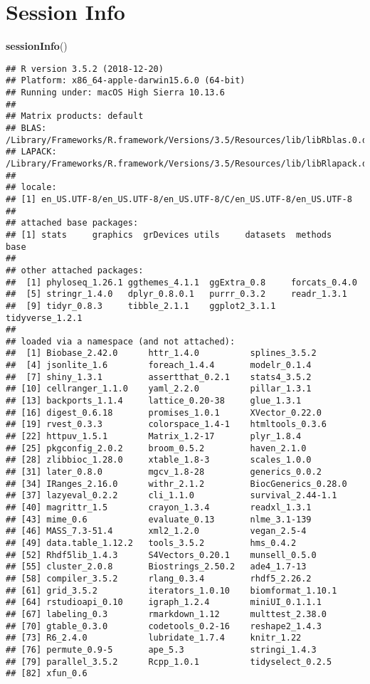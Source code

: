\documentclass[]{article}
\newenvironment{Shaded}{\begin{snugshade}}{\end{snugshade}}
\newcommand{\KeywordTok}[1]{\textcolor[rgb]{0.13,0.29,0.53}{\textbf{{#1}}}}
\newcommand{\NormalTok}[1]{{#1}}
\begin{document}
\section{Session Info}\label{session-info}

\begin{Shaded}
\begin{Highlighting}[]
\KeywordTok{sessionInfo}\NormalTok{()}
\end{Highlighting}
\end{Shaded}

\begin{verbatim}
## R version 3.5.2 (2018-12-20)
## Platform: x86_64-apple-darwin15.6.0 (64-bit)
## Running under: macOS High Sierra 10.13.6
## 
## Matrix products: default
## BLAS: /Library/Frameworks/R.framework/Versions/3.5/Resources/lib/libRblas.0.dylib
## LAPACK: /Library/Frameworks/R.framework/Versions/3.5/Resources/lib/libRlapack.dylib
## 
## locale:
## [1] en_US.UTF-8/en_US.UTF-8/en_US.UTF-8/C/en_US.UTF-8/en_US.UTF-8
## 
## attached base packages:
## [1] stats     graphics  grDevices utils     datasets  methods   base     
## 
## other attached packages:
##  [1] phyloseq_1.26.1 ggthemes_4.1.1  ggExtra_0.8     forcats_0.4.0  
##  [5] stringr_1.4.0   dplyr_0.8.0.1   purrr_0.3.2     readr_1.3.1    
##  [9] tidyr_0.8.3     tibble_2.1.1    ggplot2_3.1.1   tidyverse_1.2.1
## 
## loaded via a namespace (and not attached):
##  [1] Biobase_2.42.0      httr_1.4.0          splines_3.5.2      
##  [4] jsonlite_1.6        foreach_1.4.4       modelr_0.1.4       
##  [7] shiny_1.3.1         assertthat_0.2.1    stats4_3.5.2       
## [10] cellranger_1.1.0    yaml_2.2.0          pillar_1.3.1       
## [13] backports_1.1.4     lattice_0.20-38     glue_1.3.1         
## [16] digest_0.6.18       promises_1.0.1      XVector_0.22.0     
## [19] rvest_0.3.3         colorspace_1.4-1    htmltools_0.3.6    
## [22] httpuv_1.5.1        Matrix_1.2-17       plyr_1.8.4         
## [25] pkgconfig_2.0.2     broom_0.5.2         haven_2.1.0        
## [28] zlibbioc_1.28.0     xtable_1.8-3        scales_1.0.0       
## [31] later_0.8.0         mgcv_1.8-28         generics_0.0.2     
## [34] IRanges_2.16.0      withr_2.1.2         BiocGenerics_0.28.0
## [37] lazyeval_0.2.2      cli_1.1.0           survival_2.44-1.1  
## [40] magrittr_1.5        crayon_1.3.4        readxl_1.3.1       
## [43] mime_0.6            evaluate_0.13       nlme_3.1-139       
## [46] MASS_7.3-51.4       xml2_1.2.0          vegan_2.5-4        
## [49] data.table_1.12.2   tools_3.5.2         hms_0.4.2          
## [52] Rhdf5lib_1.4.3      S4Vectors_0.20.1    munsell_0.5.0      
## [55] cluster_2.0.8       Biostrings_2.50.2   ade4_1.7-13        
## [58] compiler_3.5.2      rlang_0.3.4         rhdf5_2.26.2       
## [61] grid_3.5.2          iterators_1.0.10    biomformat_1.10.1  
## [64] rstudioapi_0.10     igraph_1.2.4        miniUI_0.1.1.1     
## [67] labeling_0.3        rmarkdown_1.12      multtest_2.38.0    
## [70] gtable_0.3.0        codetools_0.2-16    reshape2_1.4.3     
## [73] R6_2.4.0            lubridate_1.7.4     knitr_1.22         
## [76] permute_0.9-5       ape_5.3             stringi_1.4.3      
## [79] parallel_3.5.2      Rcpp_1.0.1          tidyselect_0.2.5   
## [82] xfun_0.6
\end{verbatim}
\end{document}

